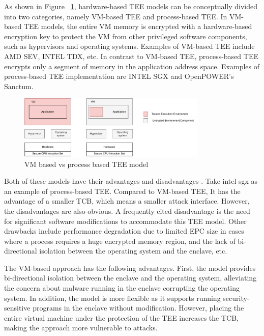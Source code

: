 As shown in Figure ~\ref{fig:vm_process_tee}, hardware-based TEE models can be conceptually divided into two categories, namely VM-based TEE and process-based TEE\cite*{101145}. In VM-based TEE models, the entire VM memory is encrypted with a hardware-based encryption key to protect the VM from other privileged 
software components, such as hypervisors and operating systems. Examples of VM-based TEE include AMD SEV\cite*{AMD_SEV}, INTEL TDX\cite*{Inte_TDX}, etc. In contrast to VM-based TEE, process-based TEE encrypts only a segment of memory in the application address space. Examples of process-based TEE implementation 
are INTEL SGX\cite*{INTEL_SGX} and OpenPOWER's Sanctum\cite*{Costan2016SanctumMH}.
\begin{figure}[H]
  \centering
  \includegraphics[width=0.8\textwidth]{images/vm_process_tee.pdf}
  \caption[VM based vs process based TEE model]{VM based vs process based TEE model}
  \label{fig:vm_process_tee}
\end{figure}

Both of these models have their advantages and disadvantages\cite*{10.3389/fcomp.2022.930741} \cite*{Execution_Environment_landscape}. Take intel sgx as an example of process-based TEE. Compared to VM-based TEE, It has the advantage of a smaller TCB, which means a smaller attack interface. However, the disadvantages are also obvious. A frequently 
cited disadvantage is the need for significant software modifications to accommodate this TEE model. Other drawbacks include performance degradation due to limited EPC size in cases where a process requires a huge encrypted memory region, and the lack of bi-directional isolation 
between the operating system and the enclave, etc.


The VM-based approach has the following advantages. First, the model provides bi-directional isolation between the enclave and the operating system, alleviating the concern about malware running in the enclave corrupting the operating system. In addition, the model is more 
flexible as it supports running security-sensitive programs in the enclave without modification. However, placing the entire virtual machine under the protection of the TEE increases the TCB, making the approach more vulnerable to attacks.

